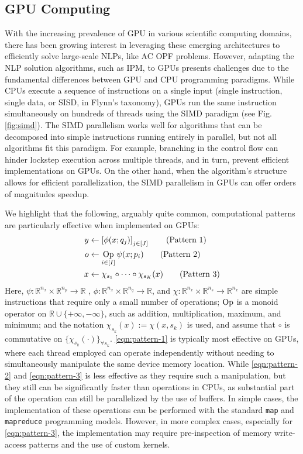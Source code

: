 \subsection{GPU Computing}\label{sec:gpu}
With the increasing prevalence of GPU in various scientific computing
domains, there has been growing interest in leveraging these emerging
architectures to efficiently solve large-scale NLPs, like AC OPF problems.
However, adapting the NLP solution algorithms,
such as IPM, to GPUs presents challenges due to the fundamental
differences between GPU and CPU programming paradigms. While CPUs
execute a sequence of instructions on a single input (single
instruction, single data, or SISD, in Flynn's taxonomy), GPUs run the
same instruction simultaneously on hundreds of threads using the SIMD
paradigm (see Fig. \ref{fig:simd}). The SIMD parallelism works well
for algorithms that can be decomposed into simple instructions running
entirely in parallel, but not all algorithms fit this
paradigm. For example, branching in the control flow can hinder
lockstep execution across multiple threads, and in turn, prevent
efficient implementations on GPUs. On the other hand, when the
algorithm's structure allows for efficient parallelization, the SIMD
parallelism in GPUs can offer orders of magnitudes speedup.

We highlight that the following, arguably quite common, computational
patterns are particularly effective when implemented on GPUs:
\begin{align}
  y&\leftarrow \left[\phi(x; q_j)\right]_{j\in [J]}\tag{Pattern 1}\label{eqn:pattern-1}\\
  o&\leftarrow  \mathop{\rm{Op}}_{i\in [I]} \psi(x;p_i) \tag{Pattern 2}\label{eqn:pattern-2}\\
  x&\leftarrow  \chi_{s_1}\circ\cdots\circ \chi_{s_K}(x) \tag{Pattern 3}\label{eqn:pattern-3}
\end{align}
Here, $\psi:\mathbb{R}^{n_x}\times \mathbb{R}^{n_{p}}\rightarrow
\mathbb{R}$ , $\phi:\mathbb{R}^{n_x}\times
\mathbb{R}^{n_{q}}\rightarrow \mathbb{R}$, and
$\chi:\mathbb{R}^{n_x}\times \mathbb{R}^{n_{s}}\rightarrow
\mathbb{R}^{n_x}$ are simple instructions that require only a small number
of operations; $\mathop{\rm{Op}}$ is a monoid operator on
$\mathbb{R}\cup\{+\infty,-\infty\}$, such as addition, multiplication,
maximum, and minimum; and the notation $\chi_{s_k}(x):=\chi(x,s_k)$ is used, and
assume that $\circ$ is commutative on $\{\chi_{s_k}(\cdot)\}_{\forall
s_k}$. \ref{eqn:pattern-1} is typically most effective on GPUs, where
each thread employed can operate independently without needing to
simultaneously manipulate the same device memory location. While
\ref{eqn:pattern-2} and \ref{eqn:pattern-3} is less effective as they
require such a manipulation, but they still can be significantly
faster than operations in CPUs, as substantial part of the operation
can still be parallelized by the use of buffers. In simple cases, the
implementation of these operations can be performed with the standard
{\tt map} and {\tt mapreduce} programming models. However, in more
complex cases, especially for \ref{eqn:pattern-3}, the
implementation may require pre-inspection of memory write-access
patterns and the use of custom kernels.

